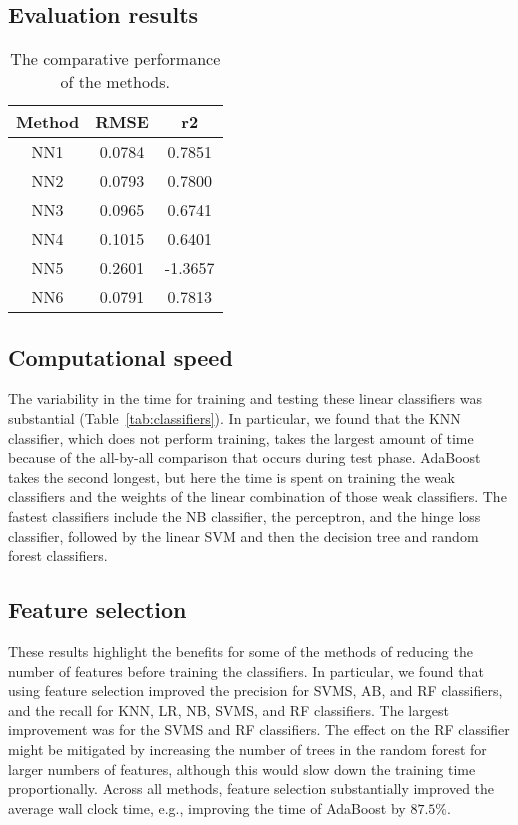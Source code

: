 \documentclass{article} %
\begin{document}
\subsection{Evaluation results}

\begin{table}
\begin{centering}
\begin{tabular}{ccc}
\hline 
Method  & RMSE & r2\tabularnewline
\hline 
\hline 
NN1  & 0.0784  & 0.7851\tabularnewline
\hline 
NN2  & 0.0793  & 0.7800\tabularnewline
\hline 
NN3  & 0.0965  & 0.6741\tabularnewline
\hline 
NN4 & 0.1015  & 0.6401\tabularnewline
\hline 
NN5 & 0.2601 & -1.3657\tabularnewline
\hline 
NN6 & 0.0791 & 0.7813\tabularnewline
\hline 
\end{tabular}
\par\end{centering}

\caption{The comparative performance of the methods.\label{tab:perf}}
\end{table}

\subsection{Computational speed}

The variability in the time for training and testing these linear classifiers was substantial (Table~\ref{tab:classifiers}). In particular, we found that the KNN classifier, which does not perform training, takes the largest amount of time because of the all-by-all comparison that occurs during test phase. AdaBoost takes the second longest, but here the time is spent on training the weak classifiers and the weights of the linear combination of those weak classifiers. The fastest classifiers include the NB classifier, the perceptron, and the hinge loss classifier, followed by the linear SVM and then the decision tree and random forest classifiers.

\subsection{Feature selection}

These results highlight the benefits for some of the methods of reducing the number of features before training the classifiers. In particular, we found that using feature selection improved the precision for SVMS, AB, and RF classifiers, and the recall for KNN, LR, NB, SVMS, and RF classifiers. The largest improvement was for the SVMS and RF classifiers. The effect on the RF classifier might be mitigated by increasing the number of trees in the random forest for larger numbers of features, although this would slow down the training time proportionally. Across all methods, feature selection substantially improved the average wall clock time, e.g., improving the time of AdaBoost by $87.5\%$.
\end{document}
